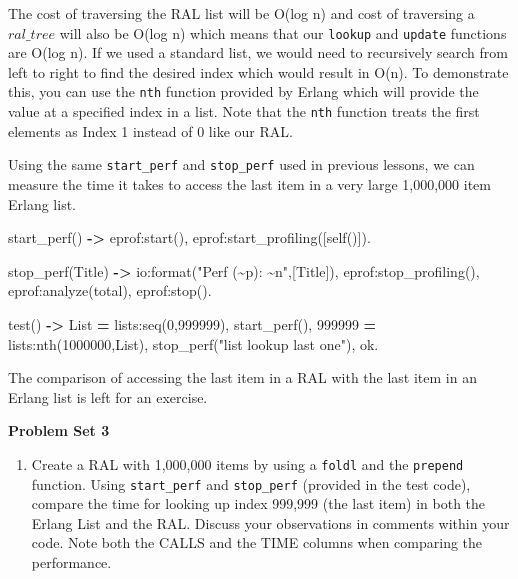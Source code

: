 \documentclass[
]{book}
\newenvironment{Shaded}{\begin{snugshade}}{\end{snugshade}}
\newcommand{\CharTok}[1]{\textcolor[rgb]{0.31,0.60,0.02}{#1}}
\newcommand{\DecValTok}[1]{\textcolor[rgb]{0.00,0.00,0.81}{#1}}
\newcommand{\FunctionTok}[1]{\textcolor[rgb]{0.00,0.00,0.00}{#1}}
\newcommand{\OperatorTok}[1]{\textcolor[rgb]{0.81,0.36,0.00}{\textbf{#1}}}
\newcommand{\StringTok}[1]{\textcolor[rgb]{0.31,0.60,0.02}{#1}}
\newcommand{\VariableTok}[1]{\textcolor[rgb]{0.00,0.00,0.00}{#1}}
\providecommand{\tightlist}{%
  \setlength{\itemsep}{0pt}\setlength{\parskip}{0pt}}
\begin{document}
The cost of traversing the RAL list will be O(log n) and cost of traversing a \(ral\_tree\) will also be O(log n) which means that our \texttt{lookup} and \texttt{update} functions are O(log n). If we used a standard list, we would need to recursively search from left to right to find the desired index which would result in O(n). To demonstrate this, you can use the \texttt{nth} function provided by Erlang which will provide the value at a specified index in a list. Note that the \texttt{nth} function treats the first elements as Index 1 instead of 0 like our RAL.

Using the same \texttt{start\_perf} and \texttt{stop\_perf} used in previous lessons, we can measure the time it takes to access the last item in a very large 1,000,000 item Erlang list.

\begin{Shaded}
\begin{Highlighting}[]
\FunctionTok{start\_perf()} \OperatorTok{{-}\textgreater{}}
    \FunctionTok{eprof:start(),}
    \FunctionTok{eprof:start\_profiling([self()]).}

\FunctionTok{stop\_perf(}\VariableTok{Title}\FunctionTok{)} \OperatorTok{{-}\textgreater{}}
    \FunctionTok{io:format(}\StringTok{"Perf (\textasciitilde{}p): \textasciitilde{}n"}\FunctionTok{,[}\VariableTok{Title}\FunctionTok{]),}
    \FunctionTok{eprof:stop\_profiling(),}
    \FunctionTok{eprof:analyze(}\CharTok{total}\FunctionTok{),}
    \FunctionTok{eprof:stop().}

\FunctionTok{test()} \OperatorTok{{-}\textgreater{}}
    \VariableTok{List} \OperatorTok{=} \FunctionTok{lists:seq(}\DecValTok{0}\FunctionTok{,}\DecValTok{999999}\FunctionTok{),}
    \FunctionTok{start\_perf(),}
    \DecValTok{999999} \OperatorTok{=} \FunctionTok{lists:nth(}\DecValTok{1000000}\FunctionTok{,}\VariableTok{List}\FunctionTok{),}
    \FunctionTok{stop\_perf(}\StringTok{"list lookup last one"}\FunctionTok{),}
    \CharTok{ok}\FunctionTok{.}
\end{Highlighting}
\end{Shaded}

The comparison of accessing the last item in a RAL with the last item in an Erlang list is left for an exercise.

\begin{problembox}

\textbf{Problem Set 3}

\begin{enumerate}
\def\labelenumi{\arabic{enumi}.}
\tightlist
\item
  Create a RAL with 1,000,000 items by using a \texttt{foldl} and the \texttt{prepend} function. Using \texttt{start\_perf} and \texttt{stop\_perf} (provided in the test code), compare the time for looking up index 999,999 (the last item) in both the Erlang List and the RAL. Discuss your observations in comments within your code. Note both the CALLS and the TIME columns when comparing the performance.
\end{enumerate}

\end{problembox}
\end{document}
